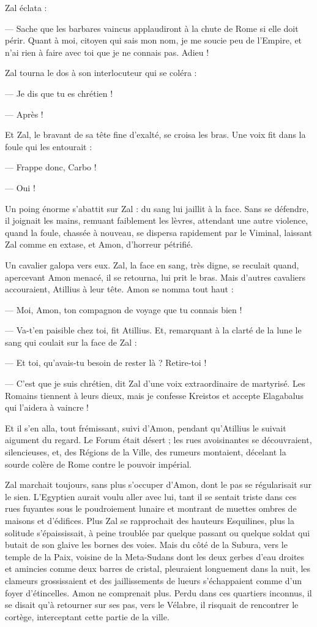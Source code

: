 \documentclass[a4paper, 11pt, oneside, polutonikogreek, french]{article}
\begin{document}
Zal éclata :

--- Sache que les barbares vaincus applaudiront à la chute de Rome si elle doit périr. Quant à moi, citoyen qui sais mon nom, je me soucie peu de l'Empire, et n'ai rien à faire avec toi que je ne connais pas. Adieu !

Zal tourna le dos à son interlocuteur qui se coléra :

--- Je dis que tu es chrétien !

--- Après !

Et Zal, le bravant de sa tête fine d'exalté, se croisa les bras. Une voix fit dans la foule qui les entourait :

--- Frappe donc, Carbo !

--- Oui !

Un poing énorme s'abattit sur Zal : du sang lui jaillit à la face. Sans se défendre, il joignait les mains, remuant faiblement les lèvres, attendant une autre violence, quand la foule, chassée à nouveau, se dispersa rapidement par le Viminal, laissant Zal comme en extase, et Amon, d'horreur pétrifié.

Un cavalier galopa vers eux. Zal, la face en sang, très digne, se reculait quand, apercevant Amon menacé, il se retourna, lui prit le bras. Mais d'autres cavaliers accouraient, Atillius à leur tête. Amon se nomma tout haut :

--- Moi, Amon, ton compagnon de voyage que tu connais bien !

--- Va-t'en paisible chez toi, fit Atillius. Et, remarquant à la clarté de la lune le sang qui coulait sur la face de Zal :

--- Et toi, qu'avais-tu besoin de rester là ? Retire-toi !

--- C'est que je suis chrétien, dit Zal d'une voix extraordinaire de martyrisé. Les Romains tiennent à leurs dieux, mais je confesse Kreistos et accepte Elagabalus qui l'aidera à vaincre !

Et il s'en alla, tout frémissant, suivi d'Amon, pendant qu'Atillius le suivait aigument du regard. Le Forum était désert ; les rues avoisinantes se découvraient, silencieuses, et, des Régions de la Ville, des rumeurs montaient, décelant la sourde colère de Rome contre le pouvoir impérial.

Zal marchait toujours, sans plus s'occuper d'Amon, dont le pas se régularisait sur le sien. L'Egyptien aurait voulu aller avec lui, tant il se sentait triste dans ces rues fuyantes sous le poudroiement lunaire et montrant de muettes ombres de maisons et d'édifices. Plus Zal se rapprochait des hauteurs Esquilines, plus la solitude s'épaississait, à peine troublée par quelque passant ou quelque soldat qui butait de son glaive les bornes des voies. Mais du côté de la Subura, vers le temple de la Paix, voisine de la Meta-Sudans dont les deux gerbes d'eau droites et amincies comme deux barres de cristal, pleuraient longuement dans la nuit, les clameurs grossissaient et des jaillissements de lueurs s'échappaient comme d'un foyer d'étincelles. Amon ne comprenait plus. Perdu dans ces quartiers inconnus, il se disait qu'à retourner sur ses pas, vers le Vélabre, il risquait de rencontrer le cortège, interceptant cette partie de la ville.
\end{document}
